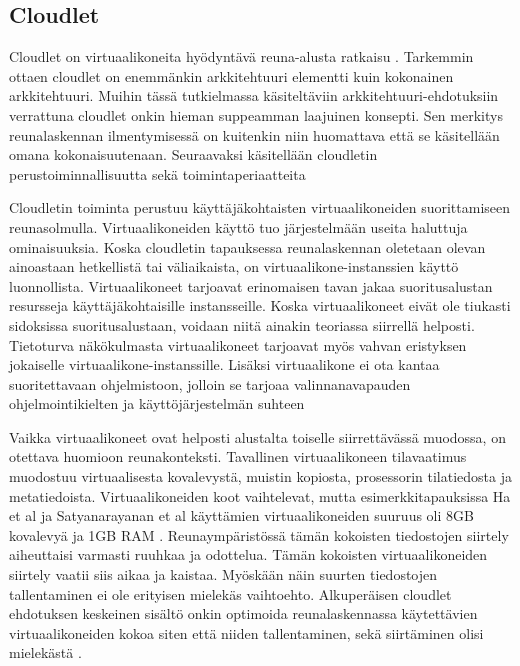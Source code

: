 \subsection{Cloudlet} \label{cloudlet}


Cloudlet on virtuaalikoneita hyödyntävä reuna-alusta ratkaisu \cite{satya09}.
Tarkemmin ottaen cloudlet on enemmänkin arkkitehtuuri elementti kuin kokonainen arkkitehtuuri. Muihin tässä tutkielmassa käsiteltäviin arkkitehtuuri-ehdotuksiin verrattuna cloudlet onkin hieman suppeamman laajuinen konsepti.
Sen merkitys reunalaskennan ilmentymisessä on kuitenkin niin huomattava että se käsitellään omana kokonaisuutenaan.
Seuraavaksi käsitellään cloudletin perustoiminnallisuutta sekä toimintaperiaatteita

Cloudletin toiminta perustuu käyttäjäkohtaisten virtuaalikoneiden suorittamiseen reunasolmulla.
Virtuaalikoneiden käyttö tuo järjestelmään useita haluttuja ominaisuuksia.
Koska cloudletin tapauksessa reunalaskennan oletetaan olevan ainoastaan hetkellistä tai väliaikaista\cite{satya09}, on virtuaalikone-instanssien käyttö luonnollista.
Virtuaalikoneet tarjoavat erinomaisen tavan jakaa suoritusalustan resursseja käyttäjäkohtaisille instansseille. 
Koska virtuaalikoneet eivät ole tiukasti sidoksissa suoritusalustaan, voidaan niitä ainakin teoriassa siirrellä helposti.
Tietoturva näkökulmasta virtuaalikoneet tarjoavat myös vahvan eristyksen jokaiselle virtuaalikone-instanssille. \cite{ha2015adaptive} 
Lisäksi virtuaalikone ei ota kantaa suoritettavaan ohjelmistoon, jolloin se tarjoaa valinnanavapauden ohjelmointikielten ja käyttöjärjestelmän suhteen

Vaikka virtuaalikoneet ovat helposti alustalta toiselle siirrettävässä muodossa, on otettava huomioon reunakonteksti. Tavallinen virtuaalikoneen tilavaatimus muodostuu virtuaalisesta kovalevystä, muistin kopiosta, prosessorin tilatiedosta ja metatiedoista.  
Virtuaalikoneiden koot vaihtelevat, mutta esimerkkitapauksissa Ha et al ja Satyanarayanan et al käyttämien virtuaalikoneiden suuruus oli 8GB kovalevyä ja  1GB RAM \cite{ha2013just, satya09}. Reunaympäristössä tämän kokoisten tiedostojen siirtely aiheuttaisi varmasti ruuhkaa ja odottelua.
Tämän kokoisten virtuaalikoneiden siirtely vaatii siis aikaa ja kaistaa. Myöskään näin suurten tiedostojen tallentaminen ei ole erityisen mielekäs vaihtoehto.
Alkuperäisen cloudlet ehdotuksen keskeinen sisältö onkin optimoida reunalaskennassa käytettävien virtuaalikoneiden kokoa siten että niiden tallentaminen, sekä siirtäminen olisi mielekästä \cite{satya09}.

